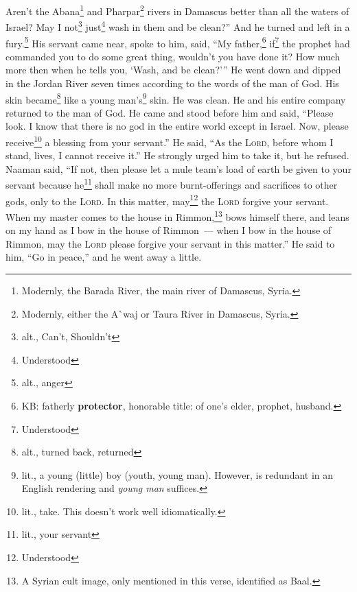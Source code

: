 \begin{inparaenum}
     Aren't the Abana\footnote{Modernly, the Barada River, the main river of Damascus, Syria.} and Pharpar\footnote{Modernly, either the A\`{}waj or Taura River in Damascus, Syria.} rivers in Damascus better than all the waters of Israel? May I not\footnote{alt., Can't, Shouldn't} just\footnote{Understood} wash in them and be clean?'' And he turned and left in a fury.\footnote{alt., anger}%
     His servant came near, spoke to him, said, ``My father,\footnote{KB: fatherly \textbf{protector}, honorable title: of one's elder, prophet, husband.} if\footnote{Understood} the prophet had commanded you to do some great thing, wouldn't you have done it? How much more then when he tells you, `Wash, and be clean?'\thinspace''%
     He went down and dipped in the Jordan River seven times according to the words of the man of God. His skin became\footnote{alt., turned back, returned} like a young man's\footnote{lit., a young (little) boy (youth, young man). However,  is redundant in an English rendering and \textit{young man} suffices.} skin. He was clean.%
     He and his entire company returned to the man of God. He came and stood before him and said, ``Please look. I know that there is no god in the entire world except in Israel. Now, please receive\footnote{lit., take. This doesn't work well idiomatically.} a blessing from your servant.''%
     He said, ``As the \textsc{Lord}, before whom I stand, lives, I cannot receive it.'' He strongly urged him to take it, but he refused.%
     Naaman said, ``If not, then please let a mule team's load of earth be given to your servant because he\footnote{lit., your servant} shall make no more burnt-offerings and sacrifices to other gods, only to the \textsc{Lord}.%
     In this matter, may\footnote{Understood} the \textsc{Lord} forgive your servant. When my master comes to the house in Rimmon,\footnote{A Syrian cult image, only mentioned in this verse, identified as Baal.} bows himself there, and leans on my hand as I bow in the house of Rimmon~--- when I bow in the house of Rimmon, may the \textsc{Lord} please forgive your servant in this matter.''%
     He said to him, ``Go in peace,'' and he went away a little.%
\end{inparaenum}
